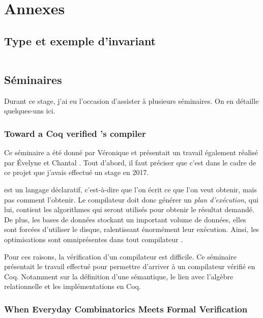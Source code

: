 \section{Annexes}

  \subsection{Type et exemple d'invariant}\label{type_invariant}

    \inputminted[bgcolor=darkBackground]{ocaml}{algo1_part.mlw}

  \subsection{Séminaires}

    Durant ce stage, j'ai eu l'occasion d'assister à plusieurs séminaires. On en détaille quelques-uns ici.

    \subsubsection{Toward a Coq verified 's compiler}

      Ce séminaire a été donné par Véronique  et présentait un travail également réalisé par Évelyne  et Chantal . Tout d'abord, il faut préciser que c'est dans le cadre de ce projet que j'avais effectué un stage en 2017.

       est un langage déclaratif, c'est-à-dire que l'on écrit ce que l'on veut obtenir, mais pas comment l'obtenir. Le compilateur doit donc générer un \emph{plan d'exécution}, qui lui, contient les algorithmes qui seront utilisés pour obtenir le résultat demandé. De plus, les bases de données stockant un important volume de données, elles sont forcées d'utiliser le disque, ralentissant énormément leur exécution. Ainsi, les optimisations sont omniprésentes dans tout compilateur .

      Pour ces raisons, la vérification d'un compilateur  est difficile. Ce séminaire présentait le travail effectué pour permettre d'arriver à un compilateur vérifié en Coq. Notamment sur la définition d'une sémantique, le lien avec l'algèbre relationnelle et les implémentations en Coq.

    \subsubsection{When Everyday Combinatorics Meets Formal Verification}

